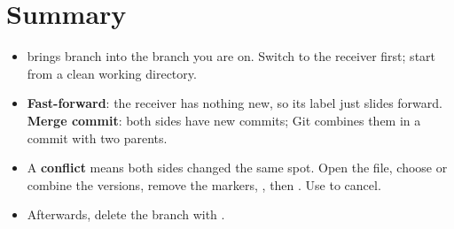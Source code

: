 \section{Summary}

\begin{itemize}
  \item {} brings branch  into the branch you are on. Switch to the receiver first; start from a clean working directory.
  \item \textbf{Fast-forward}: the receiver has nothing new, so its label just slides forward. \textbf{Merge commit}: both sides have new commits; Git combines them in a commit with two parents.
  \item A \textbf{conflict} means both sides changed the same spot. Open the file, choose or combine the versions, remove the markers, , then . Use  to cancel.
  \item Afterwards, delete the branch with .
\end{itemize}

\solutionspage




